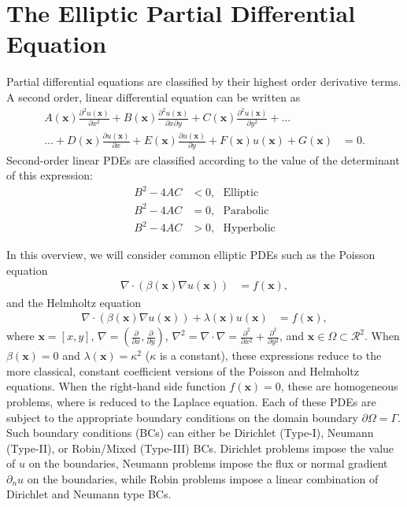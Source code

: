\section{The Elliptic Partial Differential Equation}
\label{sec:the-elliptic-pde}

Partial differential equations are classified by their highest order derivative terms. A second order, linear differential equation can be written as
\begin{align*}
    A(\textbf{x}) \frac{\partial^2 u(\textbf{x})}{\partial x^2} + B(\textbf{x}) \frac{\partial^2 u(\textbf{x})}{\partial x \partial y} + C(\textbf{x}) \frac{\partial^2 u(\textbf{x})}{\partial y^2} + ... \\
    ... + D(\textbf{x}) \frac{\partial u(\textbf{x})}{\partial x} + E(\textbf{x}) \frac{\partial u(\textbf{x})}{\partial y} + F(\textbf{x}) u(\textbf{x}) + G(\textbf{x}) &= 0.
\end{align*}
Second-order linear PDEs are classified according to the value of the determinant of this expression:
\begin{align*}
    B^2 - 4AC &< 0,\ \ \ \text{Elliptic} \\
    B^2 - 4AC &= 0,\ \ \ \text{Parabolic} \\
    B^2 - 4AC &> 0,\ \ \ \text{Hyperbolic}
\end{align*}

In this overview, we will consider common elliptic PDEs such as the Poisson equation
\begin{align}
    \nabla \cdot \left( \beta(\textbf{x}) \nabla u(\textbf{x}) \right) &= f(\textbf{x}),
    \label{eq:variable_poisson}
\end{align}
and the Helmholtz equation
\begin{align}
    \nabla \cdot \left( \beta(\textbf{x}) \nabla u(\textbf{x}) \right) + \lambda(\textbf{x}) u(\textbf{x}) &= f(\textbf{x}),
    \label{eq:variable_helmholtz}
\end{align}
where $\textbf{x} = [x, y]$, $\nabla = (\frac{\partial}{\partial x}, \frac{\partial}{\partial y})$, $\nabla^2 = \nabla \cdot \nabla = \frac{\partial^2}{\partial x^2} + \frac{\partial^2}{\partial y^2}$, and $\textbf{x} \in \Omega \subset \mathcal{R}^2$. When $\beta(\textbf{x}) = 0$ and $\lambda(\textbf{x}) = \kappa^2$ ($\kappa$ is a constant), these expressions reduce to the more classical, constant coefficient versions of the Poisson and Helmholtz equations. When the right-hand side function $f(\textbf{x}) = 0$, these are homogeneous problems, where  is reduced to the Laplace equation. Each of these PDEs are subject to the appropriate boundary conditions on the domain boundary $\partial \Omega = \Gamma$. Such boundary conditions (BCs) can either be Dirichlet (Type-I), Neumann (Type-II), or Robin/Mixed (Type-III) BCs. Dirichlet problems impose the value of $u$ on the boundaries, Neumann problems impose the flux or normal gradient $\partial_n u$ on the boundaries, while Robin problems impose a linear combination of Dirichlet and Neumann type BCs.


